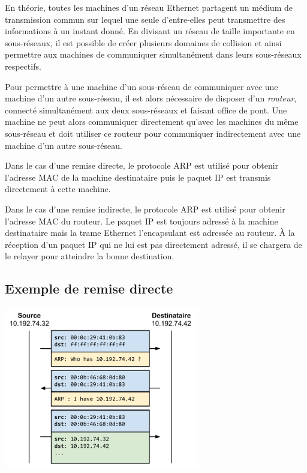 \documentclass[11pt,a4paper]{article}
\begin{document}
En théorie, toutes les machines d'un réseau Ethernet partagent un médium de transmission commun sur lequel une seule d'entre-elles peut transmettre des informations à un instant donné. En divisant un réseau de taille importante en sous-réseaux, il est possible de créer plusieurs domaines de collision et ainsi permettre aux machines de communiquer simultanément dans leurs sous-réseaux respectifs.

Pour permettre à une machine d'un sous-réseau de communiquer avec une machine d'un autre sous-réseau, il est alors nécessaire de disposer d'un \textit{routeur}, connecté simultanément aux deux sous-réseaux et faisant office de pont. Une machine ne peut alors communiquer directement qu'avec les machines du même sous-réseau et doit utiliser ce routeur pour communiquer indirectement avec une machine d'un autre sous-réseau.

Dans le cas d'une remise directe, le protocole ARP est utilisé pour obtenir l'adresse MAC de la machine destinataire puis le paquet IP est transmis directement à cette machine.

Dans le cas d'une remise indirecte, le protocole ARP est utilisé pour obtenir l'adresse MAC du routeur. Le paquet IP est toujours adressé à la machine destinataire mais la trame Ethernet l'encapsulant est adressée au routeur. À la réception d'un paquet IP qui ne lui est pas directement adressé, il se chargera de le relayer pour atteindre la bonne destination.

\subsection{Exemple de remise directe}

\begin{center}
\includegraphics[width=8.5cm]{img_direct}
\end{center}
\end{document}
